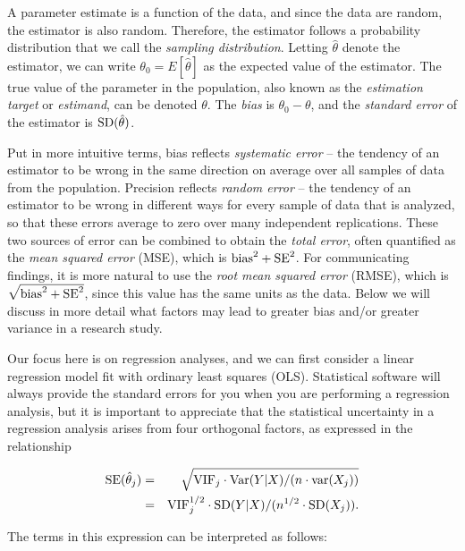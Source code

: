 A parameter estimate is a function of the data, and since the data are random, the estimator is also random.  Therefore, the estimator follows a probability distribution that we call the {\em sampling distribution}.  Letting $\hat{\theta}$ denote the estimator, we can write $\theta_0 = E[\hat{\theta}]$ as the expected value of the estimator.  The true value of the parameter in the population, also known as the {\em estimation target} or {\em estimand}, can be denoted $\theta$.  The {\em bias} is $\theta_0 - \theta$, and the {\em standard error} of the estimator is ${\rm SD}(\hat{\theta})$.

Put in more intuitive terms, bias reflects {\em systematic error} -- the tendency of an estimator to be wrong in the same direction on average over all samples of data from the population.  Precision reflects {\em random error} -- the tendency of an estimator to be wrong in different ways for every sample of data that is analyzed, so that these errors average to zero over many independent replications.  These two sources of error can be combined to obtain the {\em total error}, often quantified as the {\em mean squared error} (MSE), which is ${\rm bias}^2 + {\rm SE}^2$.  For communicating findings, it is more natural to use the {\em root mean squared error} (RMSE), which is  $\sqrt{{\rm bias}^2 + {\rm SE}^2}$, since this value has the same units as the data. Below we will discuss in more detail what factors may lead to greater bias and/or greater variance in a research study.

Our focus here is on regression analyses, and we can first consider a linear regression model fit with ordinary least squares (OLS).  Statistical software will always provide the standard errors for you when you are performing a regression analysis, but it is important to appreciate that the statistical uncertainty in a regression analysis arises from four orthogonal factors, as expressed in the relationship

\begin{eqnarray*}
{\rm SE}(\hat{\theta}_j) &=& \sqrt{{\rm VIF}_j \cdot {\rm Var}(Y|X) / (n \cdot {\rm var}(X_j))}\\
                         &=& {\rm VIF}_j^{1/2} \cdot {\rm SD}(Y|X) / (n^{1/2} \cdot {\rm SD}(X_j)).
\end{eqnarray*}

The terms in this expression can be interpreted as follows:

